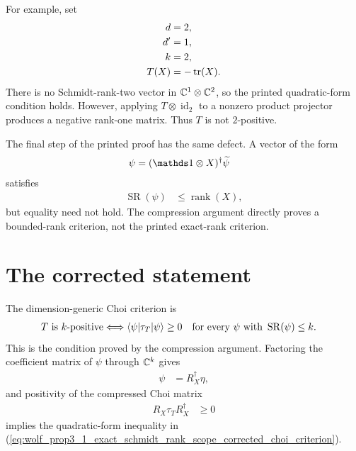 \documentclass{article}
\begin{document}
For example, set
\begin{align}
    d&=2,
    \label{eq:wolf_prop3_1_exact_schmidt_rank_scope_counterexample_input_dimension}\\
    d'&=1,
    \label{eq:wolf_prop3_1_exact_schmidt_rank_scope_counterexample_output_dimension}\\
    k&=2,
    \label{eq:wolf_prop3_1_exact_schmidt_rank_scope_counterexample_rank}\\
    T(X)&=-\operatorname{tr}(X).
    \label{eq:wolf_prop3_1_exact_schmidt_rank_scope_counterexample_map}
\end{align}
There is no Schmidt-rank-two vector in $\mathbb{C}^1\otimes\mathbb{C}^2$, so the printed
quadratic-form condition holds. However, applying
$T\otimes\operatorname{id}_2$ to a nonzero product projector produces a
negative rank-one matrix. Thus $T$ is not $2$-positive.

The final step of the printed proof has the same defect. A vector of the form
\begin{align}
    \psi
        &=(\one\otimes X)^\dagger\widetilde\psi
    \label{eq:wolf_prop3_1_exact_schmidt_rank_scope_compressed_vector}
\end{align}
satisfies
\begin{align}
    \operatorname{SR}(\psi)
        &\leq\operatorname{rank}(X),
    \label{eq:wolf_prop3_1_exact_schmidt_rank_scope_compressed_rank_bound}
\end{align}
but equality need not hold. The compression argument directly proves a
bounded-rank criterion, not the printed exact-rank criterion.

\section{The corrected statement}

The dimension-generic Choi criterion is
\begin{align}
    T\text{ is $k$-positive}
        &\Longleftrightarrow
          \langle \psi|\tau_T|\psi\rangle\geq0
          \quad\text{for every $\psi$ with }
          \operatorname{SR}(\psi)\leq k.
    \label{eq:wolf_prop3_1_exact_schmidt_rank_scope_corrected_choi_criterion}
\end{align}
This is the condition proved by the compression argument. Factoring the
coefficient matrix of $\psi$ through $\mathbb{C}^k$ gives
\begin{align}
    \psi
        &=R_X^\dagger\eta,
    \label{eq:wolf_prop3_1_exact_schmidt_rank_scope_coefficient_factorization}
\end{align}
and positivity of the compressed Choi matrix
\begin{align}
    R_X\tau_T R_X^\dagger
        &\geq0
    \label{eq:wolf_prop3_1_exact_schmidt_rank_scope_positive_compression}
\end{align}
implies the quadratic-form inequality in
(\ref{eq:wolf_prop3_1_exact_schmidt_rank_scope_corrected_choi_criterion}).
\end{document}
